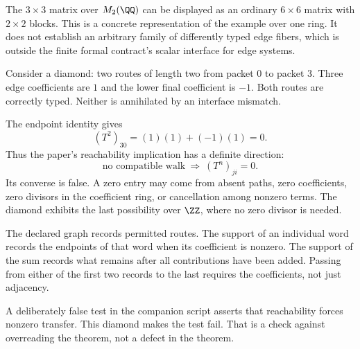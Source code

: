 The $3\times3$ matrix over $M_2(\QQ)$ can be displayed as an ordinary $6\times6$ matrix with $2\times2$ blocks. This is a concrete representation of the example over one ring. It does not establish an arbitrary family of differently typed edge fibers, which is outside the finite formal contract's scalar interface for edge systems.


Consider a diamond: two routes of length two from packet $0$ to packet $3$. Three edge coefficients are $1$ and the lower final coefficient is $-1$. Both routes are correctly typed. Neither is annihilated by an interface mismatch.


The endpoint identity gives
\[
(T^2)_{30}=(1)(1)+(-1)(1)=0.
\]
Thus the paper's reachability implication has a definite direction:
\[
\text{no compatible walk}\ \Longrightarrow\ (T^n)_{ji}=0.
\]
Its converse is false. A zero entry may come from absent paths, zero coefficients, zero divisors in the coefficient ring, or cancellation among nonzero terms. The diamond exhibits the last possibility over $\ZZ$, where no zero divisor is needed.

The declared graph records permitted routes. The support of an individual word records the endpoints of that word when its coefficient is nonzero. The support of the sum records what remains after all contributions have been added. Passing from either of the first two records to the last requires the coefficients, not just adjacency.

A deliberately false test in the companion script asserts that reachability forces nonzero transfer. This diamond makes the test fail. That is a check against overreading the theorem, not a defect in the theorem.


